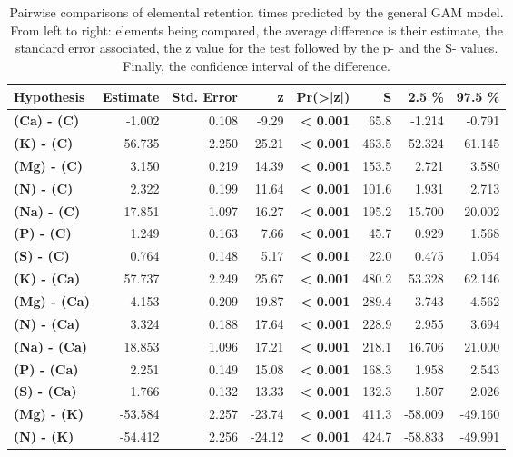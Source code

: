 \begin{table}[H]
\centering
\caption{\label{supptable:table_pairs_i_rt} Pairwise comparisons of elemental retention times predicted by the general GAM model. From left to right: elements being compared, the average difference is their estimate, the standard error associated, the z value for the test followed by the p- and the S- values. Finally, the confidence interval of the difference.}
\centering
\begin{tabular}[t]{>{}lrrr>{}rrrr}
\toprule
\textbf{ Hypothesis  } & \textbf{ Estimate } & \textbf{ Std. Error } & \textbf{ z      } & \textbf{ Pr(>|z|) } & \textbf{ S     } & \textbf{ 2.5 \%   } & \textbf{ 97.5 \%  }\\
\midrule
\textbf{(Ca) - (C)} & -1.002 & 0.108 & -9.29 & \textbf{< 0.001} & 65.8 & -1.214 & -0.791\\
\textbf{(K) - (C)} & 56.735 & 2.250 & 25.21 & \textbf{< 0.001} & 463.5 & 52.324 & 61.145\\
\textbf{(Mg) - (C)} & 3.150 & 0.219 & 14.39 & \textbf{< 0.001} & 153.5 & 2.721 & 3.580\\
\textbf{(N) - (C)} & 2.322 & 0.199 & 11.64 & \textbf{< 0.001} & 101.6 & 1.931 & 2.713\\
\textbf{(Na) - (C)} & 17.851 & 1.097 & 16.27 & \textbf{< 0.001} & 195.2 & 15.700 & 20.002\\
\textbf{(P) - (C)} & 1.249 & 0.163 & 7.66 & \textbf{< 0.001} & 45.7 & 0.929 & 1.568\\
\textbf{(S) - (C)} & 0.764 & 0.148 & 5.17 & \textbf{< 0.001} & 22.0 & 0.475 & 1.054\\
\textbf{(K) - (Ca)} & 57.737 & 2.249 & 25.67 & \textbf{< 0.001} & 480.2 & 53.328 & 62.146\\
\textbf{(Mg) - (Ca)} & 4.153 & 0.209 & 19.87 & \textbf{< 0.001} & 289.4 & 3.743 & 4.562\\
\textbf{(N) - (Ca)} & 3.324 & 0.188 & 17.64 & \textbf{< 0.001} & 228.9 & 2.955 & 3.694\\
\textbf{(Na) - (Ca)} & 18.853 & 1.096 & 17.21 & \textbf{< 0.001} & 218.1 & 16.706 & 21.000\\
\textbf{(P) - (Ca)} & 2.251 & 0.149 & 15.08 & \textbf{< 0.001} & 168.3 & 1.958 & 2.543\\
\textbf{(S) - (Ca)} & 1.766 & 0.132 & 13.33 & \textbf{< 0.001} & 132.3 & 1.507 & 2.026\\
\textbf{(Mg) - (K)} & -53.584 & 2.257 & -23.74 & \textbf{< 0.001} & 411.3 & -58.009 & -49.160\\
\textbf{(N) - (K)} & -54.412 & 2.256 & -24.12 & \textbf{< 0.001} & 424.7 & -58.833 & -49.991\\

\end{tabular}
\end{table}
